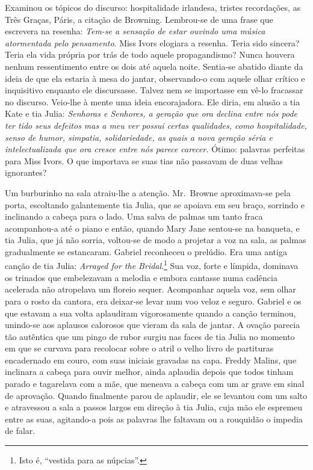 Examinou os tópicos do discurso: hospitalidade irlandesa, tristes recordações,
as Três Graças, Páris, a citação de Browning.  Lembrou-se de uma frase que
escrevera na resenha: \textit{Tem-se a sensação de estar ouvindo uma música
atormentada pelo pensamento}.  Miss Ivors elogiara a resenha.  Teria sido
sincera?  Teria ela vida própria por trás de todo aquele propagandismo?  Nunca
houvera nenhum ressentimento entre os dois até aquela noite.  Sentia-se abatido
diante da ideia de que ela estaria à mesa do jantar, observando-o com aquele
olhar crítico e inquisitivo enquanto ele discursasse.  Talvez nem se importasse
em vê-lo fracassar no discurso.  Veio-lhe à mente uma ideia encorajadora.  Ele
diria, em alusão a tia Kate e tia Julia: \textit{Senhoras e Senhores, a geração
que ora declina entre nós pode ter tido seus defeitos mas a
meu ver possui certas qualidades, como hospitalidade, senso de humor,
simpatia, solidariedade, as quais a nova geração séria e
intelectualizada que ora cresce entre nós parece carecer.} Ótimo:
palavras perfeitas para Miss Ivors.  O que importava se suas tias não passavam
de duas velhas ignorantes?

Um burburinho na sala atraiu-lhe a atenção.  Mr.~Browne aproximava-se pela
porta, escoltando galantemente tia Julia, que se apoiava em seu braço, sorrindo
e inclinando a cabeça para o lado.  Uma salva de palmas um tanto fraca
acompanhou-a até o piano e então, quando Mary Jane sentou-se na banqueta, e tia
Julia, que já não sorria, voltou-se de modo a projetar a voz na sala, as palmas
gradualmente se estancaram.  Gabriel reconheceu o prelúdio.  Era uma antiga
canção de tia Julia: \textit{Arrayed for the Bridal}.\footnote{ Isto é,
“vestida para as núpcias”.}  Sua voz, forte e límpida, dominava os
trinados que embelezavam a melodia e embora cantasse numa cadência acelerada
não atropelava um floreio sequer.  Acompanhar aquela voz, sem olhar para o
rosto da cantora, era deixar-se levar num voo veloz e seguro.  Gabriel e os que
estavam a sua volta aplaudiram vigorosamente quando a canção terminou,
unindo-se aos aplausos calorosos que vieram da sala de jantar.  A ovação
parecia tão autêntica que um pingo de rubor surgiu nas faces de tia Julia no
momento em que se curvava para recolocar sobre o atril o velho livro de
partituras encadernado em couro, com suas iniciais gravadas na capa.  Freddy
Malins, que inclinara a cabeça para ouvir melhor, ainda aplaudia depois que
todos tinham parado e tagarelava com a mãe, que meneava a cabeça com um ar
grave em sinal de aprovação.  Quando finalmente parou de aplaudir, ele se
levantou com um salto e atravessou a sala a passos largos em direção à tia
Julia, cuja mão ele espremeu entre as suas, agitando-a pois as palavras lhe
faltavam ou a rouquidão o impedia de falar.

